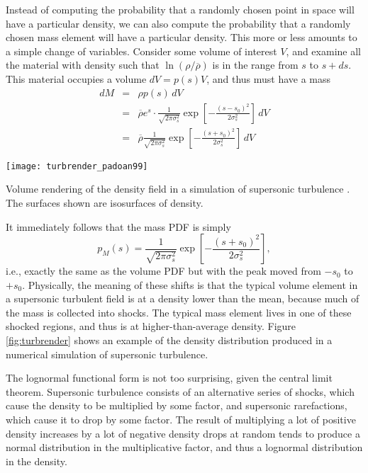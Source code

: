 Instead of computing the probability that a randomly chosen point in space will have a particular density, we can also compute the probability that a randomly chosen mass element will have a particular density. This more or less amounts to a simple change of variables. Consider some volume of interest $V$, and examine all the material with density such that $\ln(\rho/\overline{\rho})$ is in the range from $s$ to $s+ds$. This material occupies a volume $dV = p(s) V$, and thus must have a mass
\begin{eqnarray}
dM & = & \rho p(s) \, dV \\
& = & \overline{\rho} e^s \cdot \frac{1}{\sqrt{2\pi \sigma_s^2}} \exp\left[-\frac{(s-s_0)^2}{2\sigma_s^2}\right]\,  dV \\
& = & \overline{\rho} \frac{1}{\sqrt{2\pi \sigma_s^2}} \exp\left[-\frac{(s+s_0)^2}{2\sigma_s^2}\right]\,  dV
\end{eqnarray}
\begin{marginfigure}
\texttt{[image: turbrender\_padoan99]}
\caption[Volume rendering of the density field for supersonic turbulence]{
\label{fig:turbrender}
Volume rendering of the density field in a simulation of supersonic turbulence \citep{padoan99a}. The surfaces shown are isosurfaces of density.
}
\end{marginfigure}
It immediately follows that the mass PDF is simply
\begin{equation}
p_M(s) = \frac{1}{\sqrt{2\pi \sigma_s^2}} \exp\left[-\frac{(s+s_0)^2}{2\sigma_s^2}\right],
\end{equation}
i.e., exactly the same as the volume PDF but with the peak moved from $-s_0$ to $+s_0$. Physically, the meaning of these shifts is that the typical volume element in a supersonic turbulent field is at a density lower than the mean, because much of the mass is collected into shocks. The typical mass element lives in one of these shocked regions, and thus is at higher-than-average density. Figure \ref{fig:turbrender} shows an example of the density distribution produced in a numerical simulation of supersonic turbulence.

The lognormal functional form is not too surprising, given the central limit theorem. Supersonic turbulence consists of an alternative series of shocks, which cause the density to be multiplied by some factor, and supersonic rarefactions, which cause it to drop by some factor. The result of multiplying a lot of positive density increases by a lot of negative density drops at random tends to produce a normal distribution in the multiplicative factor, and thus a lognormal distribution in the density.

